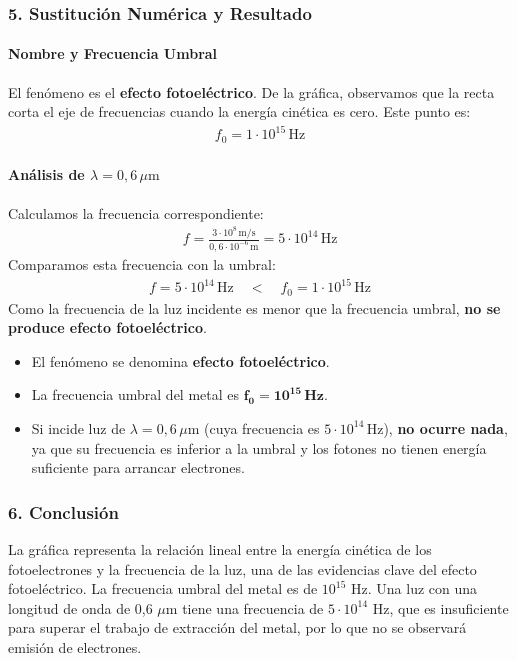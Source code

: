 \subsubsection*{5. Sustitución Numérica y Resultado}
\paragraph{Nombre y Frecuencia Umbral}
El fenómeno es el \textbf{efecto fotoeléctrico}.
De la gráfica, observamos que la recta corta el eje de frecuencias cuando la energía cinética es cero. Este punto es:
\begin{gather}
    f_0 = 1 \cdot 10^{15} \, \text{Hz}
\end{gather}

\paragraph{Análisis de $\lambda=0,6\,\mu\text{m}$}
Calculamos la frecuencia correspondiente:
\begin{gather}
    f = \frac{3 \cdot 10^8 \, \text{m/s}}{0,6 \cdot 10^{-6} \, \text{m}} = 5 \cdot 10^{14} \, \text{Hz}
\end{gather}
Comparamos esta frecuencia con la umbral:
\begin{gather}
    f = 5 \cdot 10^{14} \, \text{Hz} \quad < \quad f_0 = 1 \cdot 10^{15} \, \text{Hz}
\end{gather}
Como la frecuencia de la luz incidente es menor que la frecuencia umbral, \textbf{no se produce efecto fotoeléctrico}.
\begin{cajaresultado}
\begin{itemize}
    \item El fenómeno se denomina \textbf{efecto fotoeléctrico}.
    \item La frecuencia umbral del metal es $\boldsymbol{f_0 = 10^{15} \, \textbf{Hz}}$.
    \item Si incide luz de $\lambda=0,6\,\mu\text{m}$ (cuya frecuencia es $5 \cdot 10^{14} \, \text{Hz}$), \textbf{no ocurre nada}, ya que su frecuencia es inferior a la umbral y los fotones no tienen energía suficiente para arrancar electrones.
\end{itemize}
\end{cajaresultado}

\subsubsection*{6. Conclusión}
\begin{cajaconclusion}
La gráfica representa la relación lineal entre la energía cinética de los fotoelectrones y la frecuencia de la luz, una de las evidencias clave del efecto fotoeléctrico. La frecuencia umbral del metal es de $10^{15}$ Hz. Una luz con una longitud de onda de 0,6 $\mu$m tiene una frecuencia de $5 \cdot 10^{14}$ Hz, que es insuficiente para superar el trabajo de extracción del metal, por lo que no se observará emisión de electrones.
\end{cajaconclusion}

